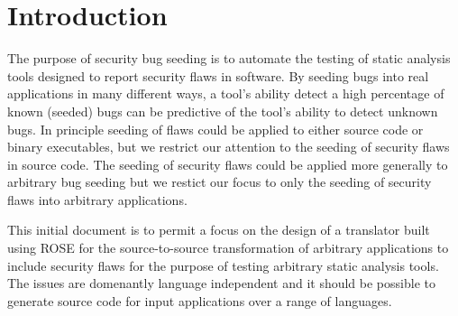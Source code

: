 \section{Introduction}


   The purpose of security bug seeding is to automate the testing of static analysis
tools designed to report security flaws in software.  By seeding bugs into
real applications in many different ways, a tool's ability detect a high
percentage of known (seeded) bugs can be predictive of the tool's
ability to detect unknown bugs.  In principle seeding of flaws could be applied 
to either source code or binary executables, but we restrict our attention to 
the seeding of security flaws in source code.  The seeding of security flaws 
could be applied more generally to arbitrary bug seeding but we 
restict our focus to only the seeding of security flaws into 
arbitrary applications.

   This initial document is to permit a focus on the design of
a translator built using ROSE for the source-to-source transformation
of arbitrary applications to include security flaws for the purpose
of testing arbitrary static analysis tools.  The issues are domenantly
language independent and it should be possible to generate source
code for input applications over a range of languages.


